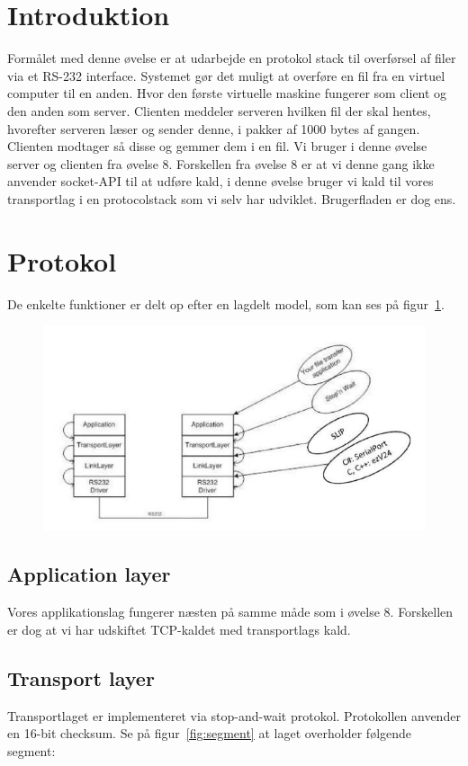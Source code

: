 \section{Introduktion}
Formålet med denne øvelse er at udarbejde en protokol stack til overførsel af filer via et RS-232 interface.
Systemet gør det muligt at overføre en fil fra en virtuel computer til en anden. Hvor den første virtuelle
maskine fungerer som client og den anden som server.
Clienten meddeler serveren hvilken fil der skal hentes, hvorefter serveren læser og sender denne, i pakker
af 1000 bytes af gangen. Clienten modtager så disse og gemmer dem i en fil.
Vi bruger i denne øvelse server og clienten fra øvelse 8. Forskellen fra øvelse 8 er at vi denne gang ikke
anvender socket-API til at udføre kald, i denne øvelse bruger vi kald til vores transportlag i en protocolstack som vi selv har udviklet. Brugerfladen er dog ens.

\section{Protokol}
De enkelte funktioner er delt op efter en lagdelt model, som kan ses på figur~\ref{fig:layers}.

\begin{figure}[h]
	\centering
	\includegraphics[width=0.7\linewidth]{figs/layers}
	\caption{}
	\label{fig:layers}
\end{figure}

\subsection{Application layer}
Vores applikationslag fungerer næsten på samme måde som i øvelse 8. Forskellen er dog at vi har udskiftet
TCP-kaldet med transportlags kald.

\subsection{Transport layer}
Transportlaget er implementeret via stop-and-wait protokol. Protokollen anvender en 16-bit checksum.
Se på figur~\ref{fig:segment} at laget overholder følgende segment:

